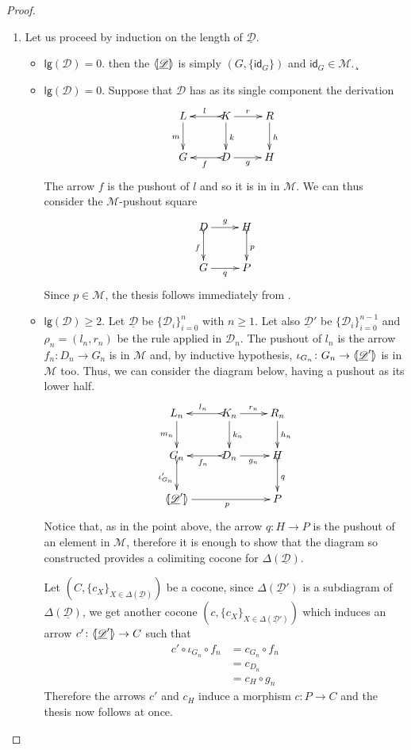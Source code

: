 \documentclass[a4paper]{article}
\newcommand{\id}[1]{\mathsf{id}_{#1}}
\newcommand{\dder}[1]{\mathscr{#1}}
\newcommand{\der}[1]{\underline{\dder{#1}}}
\newcommand{\lpro}{\langle \hspace{-1.85pt}[}
\newcommand{\rpro}{]\hspace{-1.85pt}\rangle}
\newcommand{\tpro}[1]{\lpro \der{#1}\rpro}
\newcommand{\lgh}[0]{\mathsf{lg}}
\theoremstyle{definition}
\begin{document}
\begin{proof}\begin{enumerate}
		\item Let us proceed by induction on the length of $\der{D}$.
		\begin{itemize}
			\item  $\lgh(\dder{D})=0$. then the $\tpro{\dder{D}}$ is simply $(G, \{\id{G}\})$ and $\id{G}\in \mathcal{M}$.¸
			\item $\lgh(\dder{D})=0$. Suppose that $\dder{D}$ has as its single component the derivation
			\[\xymatrix{L \ar[d]_{m}& K \ar[d]^{k}\ar@{>->}[l]_{l} \ar[r]^{r} & R \ar[d]^{h} \\G& \ar@{>->}[l]^{f} D \ar[r]_{g}& H  \\}\]
			The arrow $f$ is  the pushout of $l$ and so it is in in $\mathcal{M}$. We can thus consider the $\mathcal{M}$-pushout square
			\[\xymatrix{D \ar@{>->}[d]_{f} \ar[r]^{g} & H \ar@{>->}[d]^{p} \\G \ar[r]_{q}& P }\]
			Since $p\in \mathcal{M}$, the thesis follows immediately from . 
			\item $\lgh(\dder{D})\geq 2$. Let $\der{D}$ be $\{\dder{D}_i\}_{i=0}^n$ with $n\geq 1$. Let also $\der{D}'$ be $\{\dder{D}_i\}^{n-1}_{i=0}$ and $\rho_n=(l_n, r_n)$ be the rule applied in $\dder{D}_n$. The pushout of $l_n$ is the arrow $f_n\colon D_n\to G_n$ is in $\mathcal{M}$ and, by inductive hypothesis, $\iota_{G_{n}}\colon G_{n}\to \lpro \der{D}'\rpro$ is in $\mathcal{M}$ too. Thus, we can consider the diagram below, having a pushout as its lower half.
			\[\xymatrix{L_n \ar[d]_{m_{n}}& K_{n} \ar[d]^{k_{n}}\ar@{>->}[l]_{l_{n}} \ar[r]^{r_{n}} & R_{n} \ar[d]^{h_n} \\G_{n} \ar@{>->}[d]_{\iota'_{G_{n}}}& \ar@{>->}[l]^{f_n} D_n \ar[r]_{g_n}& H  \ar@{>->}[d]^{q}\\ \lpro \der{D}' \ar[rr]_{p}\rpro && P}\] 
			Notice that, as in the point above, the arrow $q\colon H\to P$ is the pushout of an element in $\mathcal{M}$, therefore it is enough to show that the diagram so constructed provides a colimiting cocone for $\Delta(\der{D})$.
			
			Let $(C, \{c_X\}_{X\in \Delta(\der{D})})$ be a cocone, since $\Delta(\der{D}')$ is a subdiagram of $\Delta(\der{D})$, we get another cocone $(c, \{c_X\}_{X\in \Delta(\der{D}')})$ which induces an arrow $c'\colon \lpro \der{D}' \rpro \to C$ such that
			\begin{align*}
				c'\circ \iota_{G_n} \circ f_n &=c_{G_n} \circ f_n\\&= c_{D_n}\\&= c_{H}\circ g_n
			\end{align*}
			Therefore the arrows $c'$ and $c_H$ induce a morphism $c\colon P\to C$ and the thesis now follows at once.
		\end{itemize}
		

\end{enumerate}
\end{proof}
\end{document}
